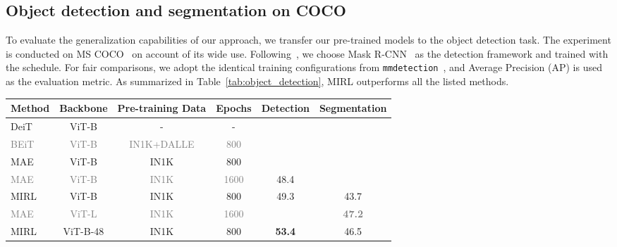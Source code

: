 \documentclass{article}
\begin{document}
\vspace{5pt}
\subsection{Object detection and segmentation on COCO}
To evaluate the generalization capabilities of our approach, we transfer our pre-trained models to the object detection task. The experiment is conducted on MS COCO~\cite{coco} on account of its wide use.
Following~\cite{he2022masked}, we choose Mask R-CNN~\cite{he2017mask} as the detection framework and trained with the {} schedule. 
For fair comparisons, we adopt the identical training configurations from \texttt{mmdetection}~\cite{chen2019mmdetection}, and Average Precision (AP) is used as the evaluation metric. As summarized in Table~\ref{tab:object_detection}, MIRL outperforms all the listed methods.


\begin{table*}[!t]
    \centering
\small
    \renewcommand{\arraystretch}{1.1}
    \addtolength{\tabcolsep}{4.3pt}
    \begin{tabular}{@{}lccccc@{}}
    \toprule
    Method & Backbone & Pre-training Data & Epochs & Detection  & Segmentation   \\
\midrule 
        DeiT \cite{touvron2021training}& ViT-B & - & - &   &  \\
\textcolor{gray}{BEiT} \cite{bao2021beit}& \textcolor{gray}{ViT-B} & \textcolor{gray}{IN1K+DALLE} &\textcolor{gray}{800} &  \textcolor{gray}{} & \textcolor{gray}{} \\
        {MAE} \cite{he2022masked} & {ViT-B} & IN1K & {800} &  {} & {} \\
        
        \textcolor{gray}{MAE} \cite{he2022masked} & \textcolor{gray}{ViT-B} & \textcolor{gray}{IN1K} & \textcolor{gray}{1600} &  {48.4}  & \textcolor{gray}{}  \\
        MIRL &ViT-B & {IN1K} & 800 &  49.3  & 43.7 \\
        \midrule
        \textcolor{gray}{MAE} \cite{he2022masked} & \textcolor{gray}{ViT-L} & \textcolor{gray}{IN1K} & \textcolor{gray}{1600} &  \textbf{\textcolor{gray}{}} & \textbf{\textcolor{gray}{47.2}} \\
        MIRL &ViT-B-48 & {IN1K} & 800 &  \textbf{53.4}  & {46.5} \\
    \bottomrule
    \end{tabular}
\caption{Object detection results with Mask R-CNN on MS-COCO.
The models pre-trained with extra data or very long schedules are marked in \textcolor{gray}{gray}.}
\label{tab:object_detection}
\vspace{10pt}
\end{table*}
\end{document}
